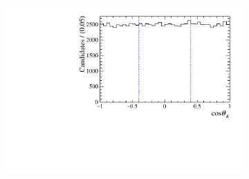 \begin{figure}[!ht]
\begin{subfigure}[t]{0.32\textwidth}
        \includegraphics[width=1.0\textwidth]{figs/B2DsPhi/NR_Helicity.pdf}
    \end{subfigure}\\


\end{figure}
